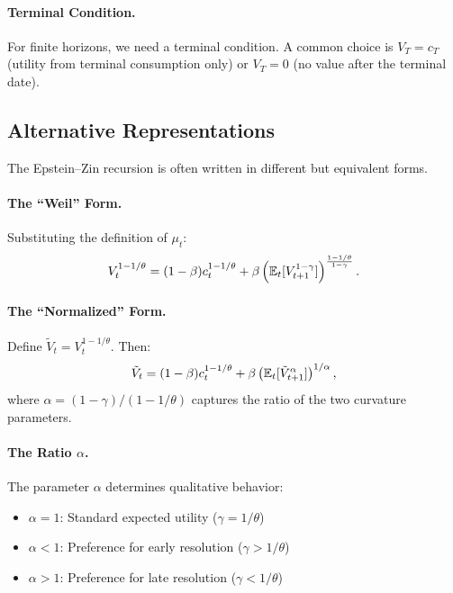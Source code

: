 \paragraph{Terminal Condition.}
For finite horizons, we need a terminal condition. A common choice is $V_T = c_T$ (utility from terminal consumption only) or $V_T = 0$ (no value after the terminal date).

\subsection{Alternative Representations}
\label{subsec:ez-alternative}

The Epstein--Zin recursion is often written in different but equivalent forms.

\paragraph{The ``Weil'' Form.}
Substituting the definition of $\mu_t$:
\begin{equation}
V_t^{1-1/\theta} = (1-\beta) c_t^{1-1/\theta} + \beta \left( \mathbb{E}_t[V_{t+1}^{1-\gamma}] \right)^{\frac{1-1/\theta}{1-\gamma}}.
\label{eq:ez-weil}
\end{equation}

\paragraph{The ``Normalized'' Form.}
Define $\tilde{V}_t = V_t^{1-1/\theta}$. Then:
\begin{equation}
\tilde{V}_t = (1-\beta) c_t^{1-1/\theta} + \beta \left( \mathbb{E}_t[\tilde{V}_{t+1}^{\alpha}] \right)^{1/\alpha},
\label{eq:ez-normalized}
\end{equation}
where $\alpha = (1-\gamma)/(1-1/\theta)$ captures the ratio of the two curvature parameters.

\paragraph{The Ratio $\alpha$.}
The parameter $\alpha$ determines qualitative behavior:
\begin{itemize}[leftmargin=2em]
    \item $\alpha = 1$: Standard expected utility ($\gamma = 1/\theta$)
    \item $\alpha < 1$: Preference for early resolution ($\gamma > 1/\theta$)
    \item $\alpha > 1$: Preference for late resolution ($\gamma < 1/\theta$)
\end{itemize}

